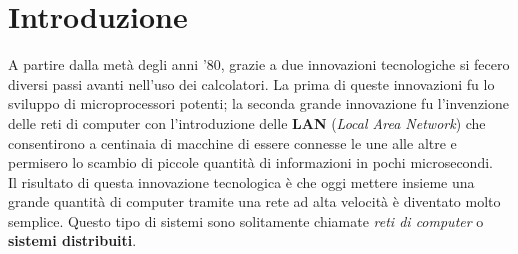 \label{capitolo1}
\section{Introduzione}
A partire dalla metà degli anni '80, grazie a due innovazioni tecnologiche si fecero diversi passi avanti nell'uso dei calcolatori. La prima di queste innovazioni fu lo sviluppo di microprocessori potenti; la seconda grande innovazione fu l'invenzione delle reti di computer con l'introduzione delle \textbf{LAN} (\emph{Local Area Network}) che consentirono a centinaia di macchine di essere connesse le une alle altre e permisero lo scambio di piccole quantità di informazioni in pochi microsecondi.\\
Il risultato di questa innovazione tecnologica è che oggi mettere insieme una grande quantità di computer tramite una rete ad alta velocità è diventato molto semplice. Questo tipo di sistemi sono solitamente chiamate \emph{reti di computer} o \textbf{sistemi distribuiti}.
